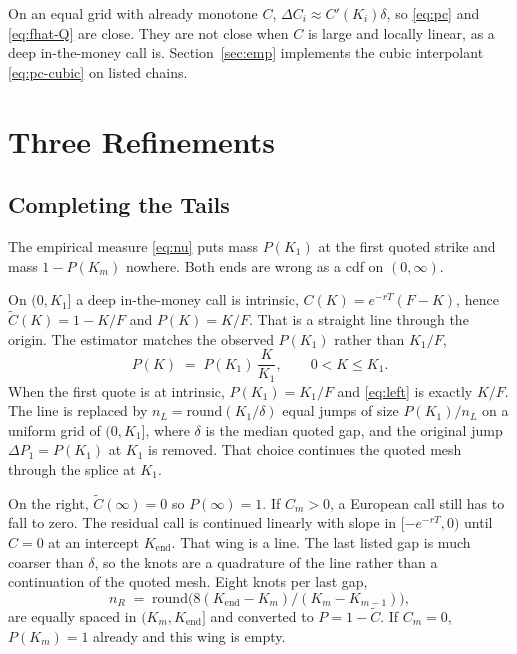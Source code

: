 \documentclass[preprint,12pt,authoryear,times]{elsarticle}
\begin{document}
On an equal grid with already monotone \(C\), \(\Delta C_i\approx C'(K_i)\delta\), so \eqref{eq:pc} and \eqref{eq:fhat-Q} are close. They are not close when \(C\) is large and locally linear, as a deep in-the-money call is. Section~\ref{sec:emp} implements the cubic interpolant \eqref{eq:pc-cubic} on listed chains.

\section{Three Refinements}
\label{sec:refine}

\subsection{Completing the Tails}
\label{sec:tails}

The empirical measure \eqref{eq:nu} puts mass \(P(K_1)\) at the first quoted strike and mass \(1-P(K_m)\) nowhere. Both ends are wrong as a cdf on \((0,\infty)\).

On \((0,K_1]\) a deep in-the-money call is intrinsic, \(C(K)=e^{-rT}(F-K)\), hence \(\tilde C(K)=1-K/F\) and \(P(K)=K/F\). That is a straight line through the origin. The estimator matches the observed \(P(K_1)\) rather than \(K_1/F\),
\begin{equation}
\label{eq:left}
P(K)
\;=\;
P(K_1)\,\frac{K}{K_1},
\qquad
0<K\le K_1.
\end{equation}
When the first quote is at intrinsic, \(P(K_1)=K_1/F\) and \eqref{eq:left} is exactly \(K/F\). The line is replaced by \(n_L=\mathrm{round}(K_1/\delta)\) equal jumps of size \(P(K_1)/n_L\) on a uniform grid of \((0,K_1]\), where \(\delta\) is the median quoted gap, and the original jump \(\Delta P_1=P(K_1)\) at \(K_1\) is removed. That choice continues the quoted mesh through the splice at \(K_1\).

On the right, \(\tilde C(\infty)=0\) so \(P(\infty)=1\). If \(C_m>0\), a European call still has to fall to zero. The residual call is continued linearly with slope in \([-e^{-rT},0)\) until \(C=0\) at an intercept \(K_{\mathrm{end}}\). That wing is a line. The last listed gap is much coarser than \(\delta\), so the knots are a quadrature of the line rather than a continuation of the quoted mesh. Eight knots per last gap,
\begin{equation}
\label{eq:nR}
n_R
\;=\;
\mathrm{round}\bigl(8(K_{\mathrm{end}}-K_m)/(K_m-K_{m-1})\bigr),
\end{equation}
are equally spaced in \((K_m,K_{\mathrm{end}}]\) and converted to \(P=1-\tilde C\). If \(C_m=0\), \(P(K_m)=1\) already and this wing is empty.
\end{document}
